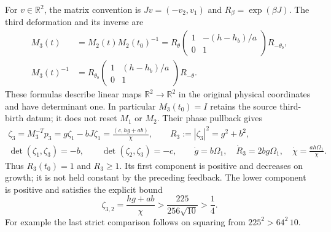 For $v\in\mathbb R^2$, the matrix convention is
$Jv=(-v_2,v_1)$ and $R_\beta=\exp(\beta J)$.
The third deformation and its inverse are
\begin{equation}\label{cvlane:tg:material}
\begin{aligned}
 M_3(t)&=M_2(t)M_2(t_0)^{-1}
 =R_\theta
   \begin{pmatrix}1&-(h-h_b)/a\\0&1\end{pmatrix}R_{-\theta_b},\\
 M_3(t)^{-1}&=R_{\theta_b}
   \begin{pmatrix}1&(h-h_b)/a\\0&1\end{pmatrix}R_{-\theta}.
\end{aligned}
\end{equation}
These formulas describe linear maps $\mathbb R^2\to\mathbb R^2$
in the original physical coordinates and have determinant one.
In particular $M_3(t_0)=I$ retains the source third-birth datum;
it does not reset $M_1$ or $M_2$.
Their phase pullback gives
\begin{equation}\label{cvlane:tg:phase}
 \begin{gathered}
 \zeta_3=M_3^{-T}p_3=g\zeta_1-bJ\zeta_1
      =\frac{(c,hg+ab)}\chi,\qquad
 R_3:=|\zeta_3|^2=g^2+b^2,\\
 \det(\zeta_1,\zeta_3)=-b,\qquad
 \det(\zeta_2,\zeta_3)=-c,\qquad
 \dot g=b\Omega_1,\quad \dot R_3=2bg\Omega_1,
 \quad\dot\chi=\frac{ah\Omega_1}{\chi}.
 \end{gathered}
\end{equation}
Thus $R_3(t_0)=1$ and $R_3\geq1$. Its first component is positive
and decreases on growth; it is not held constant by the preceding
feedback. The lower component is positive and satisfies the explicit
bound
\begin{equation}\label{cvlane:tg:domain}
 \zeta_{3,2}=\frac{hg+ab}{\chi}
       >\frac{225}{256\sqrt{10}}>\frac14.
\end{equation}
For example the last strict comparison follows on squaring from
$225^2>64^2\,10$.

